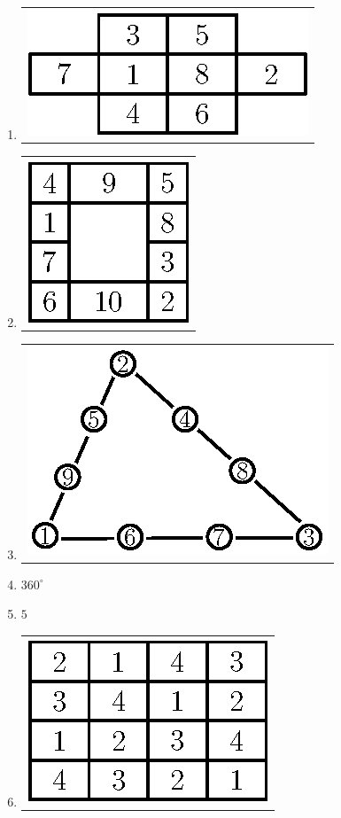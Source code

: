 \begin{enumerate}
\item 
\begin{tabular}[c]{c}
\centering
\includegraphics{src/figures/ans12.eps}
\end{tabular}

\item 
\begin{tabular}[c]{c}
\centering
\includegraphics{src/figures/ans13.eps}
\end{tabular}

\item 
\begin{tabular}[c]{c}
\centering
\includegraphics{src/figures/ans14.eps}
\end{tabular}

\item $360^{\circ}$

\item $5$

\item 
\begin{tabular}[c]{c}
\centering
\includegraphics{src/figures/ans17.eps}
\end{tabular}


\end{enumerate}
